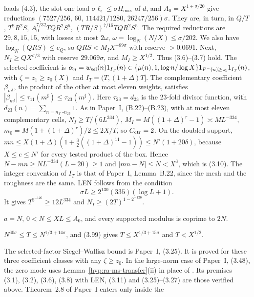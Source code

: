 \begin{description}
loads (4.3), the slot-one load \(\sigma\ell_{\mathfrak c}\le\sigma H_{\max}\)
of \(d\), and \(A_0=X^{1+\sigma/20}\) give reductions
\((7527/256,\,60,\,114421/1280,\,26247/256)\sigma\). They are, in turn, in
\(Q/T\), \(T^2R^2S\), \(A_0^{7/32}TQR^2S^5\), \((TR/S)^{7/16}TQR^2S^5\).
The required reductions are \(29,8,15,15\), with losses at most \(2\omega\),
\(\omega=\log_N(N/X)\le\sigma/202\). We also have \(\log_N(QRS)\le e_Q\), so
\(QRS<M_IX^{-89\sigma}\) with reserve \(>0.0691\). Next, \(N_I\ge QX^{\sigma/3}\)
with reserve \(29.069\sigma\), and \(M_I\ge X^{1/2}\). Thus (3.6)--(3.7)
hold. The selected coefficient is
\(\alpha_n=w_{\rm sel}(n)1_{I_T}(n)\in\{\mu(n),1,\log n/\log X\}1_{P^-(n)\ge z_1}1_{I_T}(n)\),
with \(\zeta=z_1\ge z_0(X)\) and \(I_T=(T,(1+\Delta)T]\). The complementary
coefficient \(\beta_{m^\sharp}\), the product of the other at most eleven
weights, satisfies \(|\beta_{m^\sharp}|\le\tau_{11}(m^\sharp)\le\tau_{23}(m^\sharp)\).
Here \(\tau_{23}=d_{23}\) is the 23-fold divisor function, with
\(d_{23}(n)=\sum_{n=n_1\cdots n_{23}}1\).
As in Paper~I, (B.22)--(B.23), with at most eleven complementary cells,
\(N_I\ge T/(6L^{334})\), \(M_I=M((1+\Delta)^{r}-1)\asymp ML^{-334}\),
\(m_0=M(1+(1+\Delta)^r)/2\le2X/T\), so \(C_{\rm ctr}=2\). On the doubled
support, \(mn\le X(1+\Delta)(1+\tfrac32((1+\Delta)^{11}-1))\le N'(1+20\delta)\),
because \(X\le e\le N'\) for every tested product of the box. Hence
\(N-mn\ge NL^{-334}(L-20)\ge1\) and \(|mn-N|\le N<X^3\), which is (3.10).
The integer convention of \(I_T\) is that of Paper~I, Lemma~B.22, since the
mesh and the roughness are the same. LEN follows from the condition
\begin{equation}\label{eq:k2-med-length}
 \sigma L\ge2^{130}(335)(\log L+1).
\end{equation}
It gives \(T^{2^{-126}}\ge12L^{334}\) and
\(N_I\ge(2T)^{1-2^{-126}}\).
\item[H4.] \(a=N\), \(0<N\le XL\le A_0\), and every supported modulus is
coprime to \(2N\).
\item[H5.] \(N^{60\sigma}\le T\le N^{1/3+14\sigma}\), and (3.99) gives
\(T\le X^{1/3+15\sigma}\) and \(T<X^{1/2}\).
\end{description}
The selected-factor Siegel--Walfisz bound is Paper~I, (3.25). It is
proved for these three coefficient classes with any \(\zeta\ge z_0\). In the
large-norm case of Paper~I, (3.48), the zero mode uses
Lemma~\ref{hyp:ra-ms-transfer}(ii) in place of \cite[Theorem~0(a)]{BFI86}.
Its premises (3.1), (3.2), (3.6), (3.8) with LEN, (3.11) and (3.25)--(3.27)
are those verified above. Theorem~2.8 of Paper~I enters only inside the
